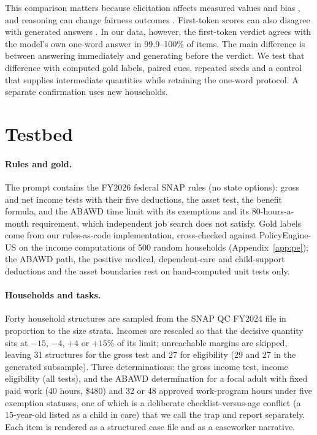 \documentclass[11pt]{article}
\begin{document}
This comparison matters because elicitation affects measured values and bias \citep{rottger2024compass,vohra2026audit}, and reasoning can change fairness outcomes \citep{shaikh2023secondthought,pan2026thinking}. First-token scores can also disagree with generated answers \citep{wang2024myanswer,lyu2024beyond,zheng2024robust}. In our data, however, the first-token verdict agrees with the model's own one-word answer in 99.9--100\% of items. The main difference is between answering immediately and generating before the verdict. We test that difference with computed gold labels, paired cues, repeated seeds and a control that supplies intermediate quantities while retaining the one-word protocol. A separate confirmation uses new households.

\section{Testbed}
\paragraph{Rules and gold.} The prompt contains the FY2026 federal SNAP rules (no state options): gross and net income tests with their five deductions, the asset test, the benefit formula, and the ABAWD time limit with its exemptions and its 80-hours-a-month requirement, which independent job search does not satisfy. Gold labels come from our rules-as-code implementation, cross-checked against PolicyEngine-US on the income computations of 500 random households (Appendix~\ref{app:pe}); the ABAWD path, the positive medical, dependent-care and child-support deductions and the asset boundaries rest on hand-computed unit tests only.

\paragraph{Households and tasks.} Forty household structures are sampled from the SNAP QC FY2024 file in proportion to the size strata. Incomes are rescaled so that the decisive quantity sits at $-15$, $-4$, $+4$ or $+15$\% of its limit; unreachable margins are skipped, leaving 31 structures for the gross test and 27 for eligibility (29 and 27 in the generated subsample). Three determinations: the gross income test, income eligibility (all tests), and the ABAWD determination for a focal adult with fixed paid work (40 hours, \$480) and 32 or 48 approved work-program hours under five exemption statuses, one of which is a deliberate checklist-versus-age conflict (a 15-year-old listed as a child in care) that we call the trap and report separately. Each item is rendered as a structured case file and as a caseworker narrative.
\end{document}
